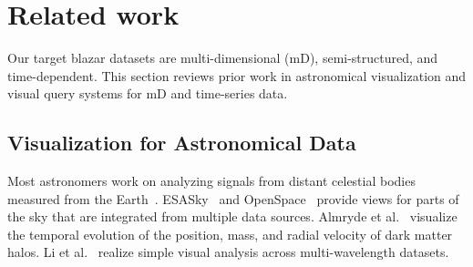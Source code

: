 \section{Related work\label{sec:relatedWork}}
Our target blazar datasets are multi-dimensional (mD), semi-structured, and time-dependent.
This section reviews prior work in astronomical visualization and visual query systems for mD and time-series data. 


\subsection{Visualization for Astronomical Data}\label{sec:relatedAstronomy}
Most astronomers work on analyzing signals from distant celestial bodies measured from the Earth~\cite{Kent2017}. 
ESASky~\cite{Baines2017} and OpenSpace~\cite{Bock2020} provide views for parts of the sky that are integrated from multiple data sources.
Almryde et al.~\cite{Almryde2016} visualize the temporal evolution of the position, mass, and radial velocity of dark matter halos. 
Li et al.~\cite{Li2008} realize simple visual analysis across multi-wavelength datasets.
